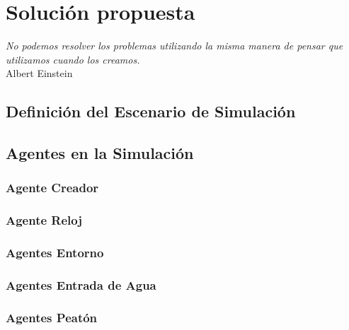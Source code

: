 
\chapter*{Solución propuesta} \label{cap3}


\begin{flushright}
\begin{minipage}{7.85cm}
    {\em No podemos resolver los problemas utilizando la misma manera de pensar
    que utilizamos cuando los creamos.} \\ Albert Einstein
\end{minipage}
\end{flushright}

\vspace*{5mm}

\section*{Definición del Escenario de Simulación}

\section*{Agentes en la Simulación}


\subsection*{Agente Creador}

\subsection*{Agente Reloj}

\subsection*{Agentes Entorno}

\subsection*{Agentes Entrada de Agua}

\subsection*{Agentes Peatón}

